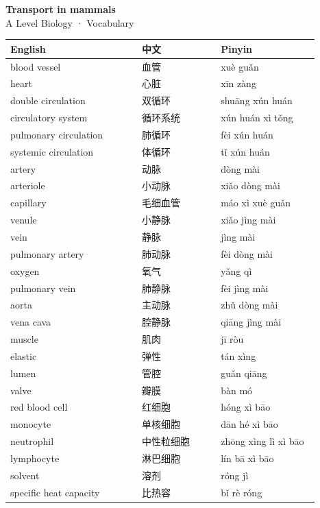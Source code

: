 \documentclass[11pt]{article}
\begin{document}
\begin{center}
  {\LARGE\bfseries Transport in mammals}\\[0.35em]
  {\large A Level Biology · Vocabulary}
\end{center}
\vspace{0.6em}

\begin{longtable}{@{}p{0.40\linewidth}p{0.24\linewidth}p{0.30\linewidth}@{}}
\toprule
\textbf{English} & \textbf{中文} & \textbf{Pinyin} \\
\midrule
\endhead
\bottomrule
\endlastfoot
blood vessel & 血管 & xuè guǎn \\
heart & 心脏 & xīn zàng \\
double circulation & 双循环 & shuāng xún huán \\
circulatory system & 循环系统 & xún huán xì tǒng \\
pulmonary circulation & 肺循环 & fèi xún huán \\
systemic circulation & 体循环 & tǐ xún huán \\
artery & 动脉 & dòng mài \\
arteriole & 小动脉 & xiǎo dòng mài \\
capillary & 毛细血管 & máo xì xuè guǎn \\
venule & 小静脉 & xiǎo jìng mài \\
vein & 静脉 & jìng mài \\
pulmonary artery & 肺动脉 & fèi dòng mài \\
oxygen & 氧气 & yǎng qì \\
pulmonary vein & 肺静脉 & fèi jìng mài \\
aorta & 主动脉 & zhǔ dòng mài \\
vena cava & 腔静脉 & qiāng jìng mài \\
muscle & 肌肉 & jī ròu \\
elastic & 弹性 & tán xìng \\
lumen & 管腔 & guǎn qiāng \\
valve & 瓣膜 & bàn mó \\
red blood cell & 红细胞 & hóng xì bāo \\
monocyte & 单核细胞 & dān hé xì bāo \\
neutrophil & 中性粒细胞 & zhōng xìng lì xì bāo \\
lymphocyte & 淋巴细胞 & lín bā xì bāo \\
solvent & 溶剂 & róng jì \\
specific heat capacity & 比热容 & bǐ rè róng \\

\end{longtable}
\end{document}

